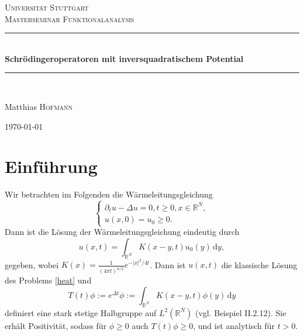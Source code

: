 \documentclass[11pt,twoside,a4paper]{article}
\theoremstyle{break}
\begin{document}
\cleardoublepage
\begin{titlepage}

\begin{center}



\textsc{\LARGE Universit\"at Stuttgart}\\[1.5cm]

\textsc{\Large Masterseminar Funktionalanalysis}\\[0.5cm]


\newcommand{\HRule}{\rule{\linewidth}{0.5mm}}
\HRule \\[0.4cm]
{ \huge \bfseries Schr\"odingeroperatoren mit inversquadratischem Potential}\\[0.4cm]

\HRule \\[1.5cm]


\begin{center} \Large
Matthias \textsc{Hofmann}
\end{center}

\hfill

\vfill

{\large \today}

\end{center}

\end{titlepage}

\thispagestyle{empty}
\mbox{}\newpage
\addtocounter{page}{-2}
\section{Einf\"uhrung}
Wir betrachten im Folgenden die W\"armeleitungsgleichung
\begin{equation}\label{heat}
\begin{cases}
\partial_t u - \Delta u =0, t\ge 0, x\in \mathbb R^N,\\
u(x,0)=u_0 \ge 0.
\end{cases}
\end{equation}
Dann ist die L\"osung der W\"armeleitungsgleichung eindeutig durch
\begin{equation}
u(x,t)=\int_{\mathbb R^N} K(x-y, t) u_0(y) \, \mathrm dy,
\end{equation}
gegeben, wobei $K(x)=\frac{1}{(4\pi t)^{n/2}} e^{-|x|^2/4t}$. Dann ist $u(x,t)$ die klassische L\"osung des Problems \eqref{heat} 
und
\begin{equation}
T(t)\phi:=e^{\Delta t}\phi:=\int_{\mathbb R^N} K(x-y,t) \phi(y)\, \mathrm dy 
\end{equation}
definiert eine stark stetige Halbgruppe auf $L^2(\mathbb R^N)$ (vgl. \cite{engel-nagel} Beispiel II.2.12). Sie erh\"alt Positivit\"at, sodass f\"ur $\phi \ge 0$ auch $T(t) \phi \ge 0$, und ist analytisch f\"ur $t>0$.
\end{document}
